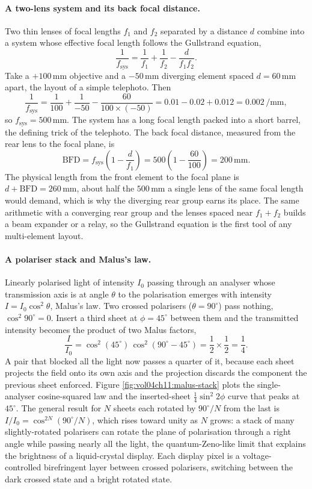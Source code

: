 \paragraph{A two-lens system and its back focal distance.} Two thin lenses of
focal lengths $f_{1}$ and $f_{2}$ separated by a distance $d$ combine into a
system whose effective focal length follows the Gullstrand equation,
\[
\frac{1}{f_{\text{sys}}} = \frac{1}{f_{1}} + \frac{1}{f_{2}}
- \frac{d}{f_{1} f_{2}}.
\]
Take a $+100\,\si{\milli\meter}$ objective and a $-50\,\si{\milli\meter}$
diverging element spaced $d = 60\,\si{\milli\meter}$ apart, the layout of a
simple telephoto. Then
\[
\frac{1}{f_{\text{sys}}} = \frac{1}{100} + \frac{1}{-50}
- \frac{60}{100\times(-50)}
= 0.01 - 0.02 + 0.012 = 0.002\,\si{\per\milli\meter},
\]
so $f_{\text{sys}} = 500\,\si{\milli\meter}$. The system has a long focal
length packed into a short barrel, the defining trick of the telephoto. The
back focal distance, measured from the rear lens to the focal plane, is
\[
\text{BFD} = f_{\text{sys}}\left(1 - \frac{d}{f_{1}}\right)
= 500\left(1 - \frac{60}{100}\right) = 200\,\si{\milli\meter}.
\]
The physical length from the front element to the focal plane is
$d + \text{BFD} = 260\,\si{\milli\meter}$, about half the $500\,\si{\milli
\meter}$ a single lens of the same focal length would demand, which is why the
diverging rear group earns its place. The same arithmetic with a converging
rear group and the lenses spaced near $f_{1} + f_{2}$ builds a beam expander
or a relay, so the Gullstrand equation is the first tool of any multi-element
layout.

\paragraph{A polariser stack and Malus's law.} Linearly polarised light of
intensity $I_{0}$ passing through an analyser whose transmission axis is at
angle $\theta$ to the polarisation emerges with intensity
$I = I_{0}\cos^{2}\theta$, Malus's law. Two crossed polarisers ($\theta =
90^{\circ}$) pass nothing, $\cos^{2}90^{\circ} = 0$. Insert a third sheet at
$\phi = 45^{\circ}$ between them and the transmitted intensity becomes the
product of two Malus factors,
\[
\frac{I}{I_{0}} = \cos^{2}(45^{\circ})\,\cos^{2}(90^{\circ}-45^{\circ})
= \frac{1}{2}\times\frac{1}{2} = \frac{1}{4}.
\]
A pair that blocked all the light now passes a quarter of it, because each
sheet projects the field onto its own axis and the projection discards the
component the previous sheet enforced. Figure \ref{fig:vol04ch11:malus-stack}
plots the single-analyser cosine-squared law and the inserted-sheet
$\tfrac{1}{4}\sin^{2}2\phi$ curve that peaks at $45^{\circ}$. The general
result for $N$ sheets each rotated by $90^{\circ}/N$ from the last is
$I/I_{0} = \cos^{2N}(90^{\circ}/N)$, which rises toward unity as $N$ grows: a
stack of many slightly-rotated polarisers can rotate the plane of polarisation
through a right angle while passing nearly all the light, the quantum-Zeno-like
limit that explains the brightness of a liquid-crystal display. Each display
pixel is a voltage-controlled birefringent layer between crossed polarisers,
switching between the dark crossed state and a bright rotated state.

